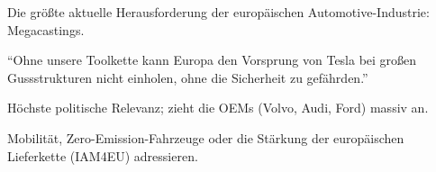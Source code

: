\documentclass[12pt,a4paper]{article}
\begin{document}
\begin{description}[leftmargin=*, style=nextline]
  \item[Fokus:] Die größte aktuelle Herausforderung der europäischen
        Automotive-Industrie: Megacastings.
  \item[Kernargument:] "`Ohne unsere Toolkette kann Europa den Vorsprung von
        Tesla bei großen Gussstrukturen nicht einholen, ohne die Sicherheit
        zu gefährden."'
  \item[Stärke:] Höchste politische Relevanz; zieht die OEMs (Volvo, Audi,
        Ford) massiv an.
  \item[Passt zu Calls, die:] Mobilität, Zero-Emission-Fahrzeuge oder die
        Stärkung der europäischen Lieferkette (IAM4EU) adressieren.
\end{description}
\end{document}
